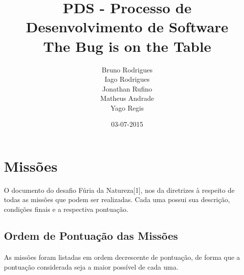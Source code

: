 \documentclass[12pt,a4paper]{article}
\title{PDS - Processo de Desenvolvimento de Software\\The Bug is on the Table}
\date{03-07-2015}
\author{Bruno Rodrigues\\Iago Rodrigues\\Jonathan Rufino\\Matheus Andrade\\Yago 
Regis}
\begin{document}
\maketitle
{}

\newpage
{}

\newpage
\listoffigures

\newpage
\listoftables

\newpage
\tableofcontents

\newpage
\section{Missões}
	\paragraph{}
		O documento do desafio Fúria da Natureza[1], nos da diretrizes à 
		respeito de todas as missões que podem ser realizadas. Cada uma possui 
		sua descrição, condições finais e a respectiva pontuação.

	\subsection{Ordem de Pontuação das Missões}
		\paragraph{}
			As missões foram listadas em ordem decrescente de pontuação, de 
			forma que a pontuação considerada seja a maior possível de cada uma.
\end{document}
